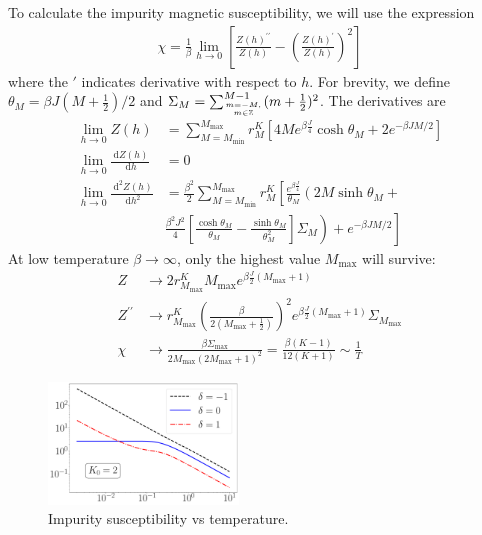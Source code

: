 \documentclass[reprint,prb,superscriptaddress]{revtex4-2}
\begin{document}
To calculate the impurity magnetic susceptibility, we will use the expression
\begin{align}
	\chi = \frac{1}{\beta}\lim_{h \to 0}\left[\frac{Z(h)^{\prime\prime}}{Z(h)} - \left(\frac{Z(h)^{\prime}}{Z(h)}\right)^2 \right] 
\end{align}
where the \(\prime\) indicates derivative with respect to \(h\). For brevity, we define \(\theta_M = \beta J (M+\frac{1}{2})/2\) and \(\Sigma_M = \sum_{m=-M, \atop{m\in \mathbb{Z}}}^{M-1}(m+\frac{1}{2})^2\). The derivatives are
\begin{align}
	\lim_{h \to 0}Z(h) &= \sum_{M=M_\text{min}}^{M_\text{max}}r^K_M\left[4Me^{\beta \frac{J}{4}}\cosh \theta_M + 2e^{-\beta JM/2}\right]\\
	\lim_{h \to 0}\frac{\:\mathrm{d}Z(h)}{\:\mathrm{d}h} &=  0\\
	\lim_{h \to 0}\frac{\:\mathrm{d}^2Z(h)}{\:\mathrm{d}h^2} &= \frac{\beta^2}{2}\sum_{M=M_\text{min}}^{M_\text{max}}r^K_M\left[\frac{e^{\beta \frac{J}{4}}}{\theta_M}\left(2M\sinh \theta_M + \right.\right.\nonumber\\
								 &\left.\left.\frac{\beta^2 J^2}{4}\left[\frac{\cosh\theta_M}{\theta_M} - \frac{\sinh \theta_M}{\theta_M^2}\right]\Sigma_M\right)+ e^{-\beta JM/2}\right]
\end{align}
At low temperature \(\beta \to \infty\), only the highest value \(M_\text{max}\) will survive:
\begin{align}
	Z &\to 2 r^K_{M_\text{max}} M_\text{max} e^{\beta \frac{J}{2}(M_\text{max} + 1)}\\
	Z^{\prime \prime} &\to r^K_{M_\text{max}}\left(\frac{\beta }{2(M_\text{max} + \frac{1}{2})}\right)^2 e^{\beta \frac{J}{2}(M_\text{max} + 1)}\Sigma_{M_\text{max}}\\
	\chi &\to \frac{\beta\Sigma_\text{max}}{2M_\text{max}\left(2M_\text{max}+1\right)^2} = \frac{\beta(K-1)}{12(K+1)} \sim \frac{1}{T}
\end{align}

\begin{figure}
\centering
\includegraphics[width=0.45\textwidth]{plt/Central_Field_Chi_Powerlaw_}
\caption{Impurity susceptibility vs temperature.}
\label{fig:suseptibility_impurity}
\end{figure}
\end{document}
